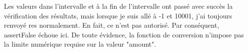 \documentclass{article}
\begin{document}
Les valeurs dans l'intervalle et à la fin de l'intervalle ont passé avec succès la vérification des résultats, mais lorsque je suis allé à -1 et 10001, j'ai toujours renvoyé res normalement. En fait, ce n'est pas autorisé. Par conséquent, assertFalse échoue ici. De toute évidence, la fonction de conversion n'impose pas la limite numérique requise sur la valeur "amount".\\
\end{document}
